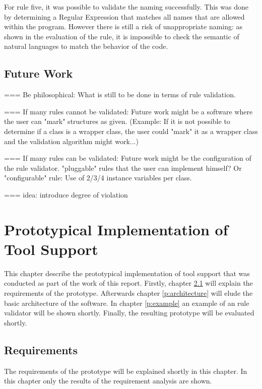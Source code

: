 For rule five, it was possible to validate the naming successfully. This was done by determining a Regular Expression that matches all names that are allowed within the program. However there is still a risk of unappropriate naming: as shown in the evaluation of the rule, it is impossible to check the semantic of natural languages to match the behavior of the code.

\section{Future Work}
\label{e:future}
=== Be philosophical: What is still to be done in terms of rule validation. 

=== If many rules cannot be validated: Future work might be a software where the user can "mark" structures as given. (Example: If it is not possible to determine if a class is a wrapper class, the user could "mark" it as a wrapper class and the validation algorithm might work...)

=== If many rules can be validated: Future work might be the configuration of the rule validator. "pluggable" rules that the user can implement himself? Or "configurable" rule: Use of 2/3/4 instance variables per class.

=== idea: introduce degree of violation







\chapter{Prototypical Implementation of Tool Support}
\label{Prototype}
This chapter describe the prototypical implementation of tool support that was conducted as part of the work of this report. Firstly, chapter \ref{p:requirements} will explain the requirements of the prototype. Afterwards chapter \ref{p:architecture} will elude the basic architecture of the software. In chapter \ref{p:example} an example of an rule validator will be shown shortly. Finally, the resulting prototype will be evaluated shortly. 

\section{Requirements}
\label{p:requirements}
The requirements of the prototype will be explained shortly in this chapter. In this chapter only the results of the requirement analysis are shown.
\\

